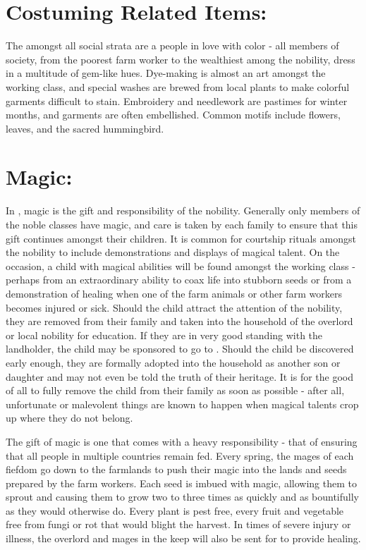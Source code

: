 \documentclass[blue]{GL2020}
\begin{document}
\section*{Costuming Related Items:}

The \pFarm{} amongst all social strata are a people in love with color - all members of society, from the poorest farm worker to the wealthiest among the nobility, dress in a multitude of gem-like hues.  Dye-making is almost an art amongst the working class, and special washes are brewed from local plants to make colorful garments difficult to stain.  Embroidery and needlework are pastimes for winter months, and garments are often embellished.  Common motifs include flowers, leaves, and the sacred hummingbird.

\section*{Magic:}

In \pFarm{}, magic is the gift and responsibility of the nobility. Generally only members of the noble classes have magic, and care is taken by each family to ensure that this gift continues amongst their children.  It is common for courtship rituals amongst the nobility to include demonstrations and displays of magical talent.  On the occasion, a child with magical abilities will be found amongst the working class - perhaps from an extraordinary ability to coax life into stubborn seeds or from a demonstration of healing when one of the farm animals or other farm workers becomes injured or sick.  Should the child attract the attention of the nobility, they are removed from their family and taken into the household of the overlord or local nobility for education.  If they are in very good standing with the landholder, the child may be sponsored to go to \pSchool{}.  Should the child be discovered early enough, they are formally adopted into the household as another son or daughter and may not even be told the truth of their heritage.  It is for the good of all to fully remove the child from their family as soon as possible - after all, unfortunate or malevolent things are known to happen when magical talents crop up where they do not belong.

The gift of magic is one that comes with a heavy responsibility - that of ensuring that all people in multiple countries remain fed.  Every spring, the mages of each fiefdom go down to the farmlands to push their magic into the lands and seeds prepared by the farm workers.  Each seed is imbued with magic, allowing them to sprout and causing them to grow two to three times as quickly and as bountifully as they would otherwise do.  Every plant is pest free, every fruit and vegetable free from fungi or rot that would blight the harvest.  In times of severe injury or illness, the overlord and mages in the keep will also be sent for to provide healing.   
\end{document}
